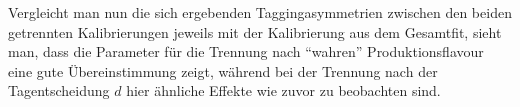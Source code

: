 Vergleicht man nun die sich ergebenden Taggingasymmetrien zwischen den beiden getrennten Kalibrierungen jeweils mit der Kalibrierung aus dem Gesamtfit, sieht man, dass die Parameter für die Trennung nach \enquote{wahren} Produktionsflavour eine gute Übereinstimmung zeigt, während bei der Trennung nach der Tagentscheidung $d$ hier ähnliche Effekte wie zuvor zu beobachten sind. 
